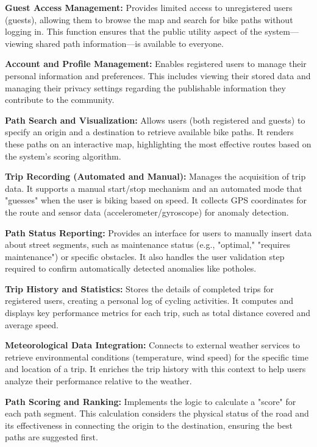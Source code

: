 \textbf{Guest Access Management:} Provides limited access to unregistered users (guests), allowing them to browse the map and search for bike paths without logging in. This function ensures that the public utility aspect of the system—viewing shared path information—is available to everyone.

\textbf{Account and Profile Management:} Enables registered users to manage their personal information and preferences. This includes viewing their stored data and managing their privacy settings regarding the publishable information they contribute to the community.

\textbf{Path Search and Visualization:} Allows users (both registered and guests) to specify an origin and a destination to retrieve available bike paths. It renders these paths on an interactive map, highlighting the most effective routes based on the system's scoring algorithm.

\textbf{Trip Recording (Automated and Manual):} Manages the acquisition of trip data. It supports a manual start/stop mechanism and an automated mode that "guesses" when the user is biking based on speed. It collects GPS coordinates for the route and sensor data (accelerometer/gyroscope) for anomaly detection.

\textbf{Path Status Reporting:} Provides an interface for users to manually insert data about street segments, such as maintenance status (e.g., "optimal," "requires maintenance") or specific obstacles. It also handles the user validation step required to confirm automatically detected anomalies like potholes.

\textbf{Trip History and Statistics:} Stores the details of completed trips for registered users, creating a personal log of cycling activities. It computes and displays key performance metrics for each trip, such as total distance covered and average speed.

\textbf{Meteorological Data Integration:} Connects to external weather services to retrieve environmental conditions (temperature, wind speed) for the specific time and location of a trip. It enriches the trip history with this context to help users analyze their performance relative to the weather.

\textbf{Path Scoring and Ranking:} Implements the logic to calculate a "score" for each path segment. This calculation considers the physical status of the road and its effectiveness in connecting the origin to the destination, ensuring the best paths are suggested first.

